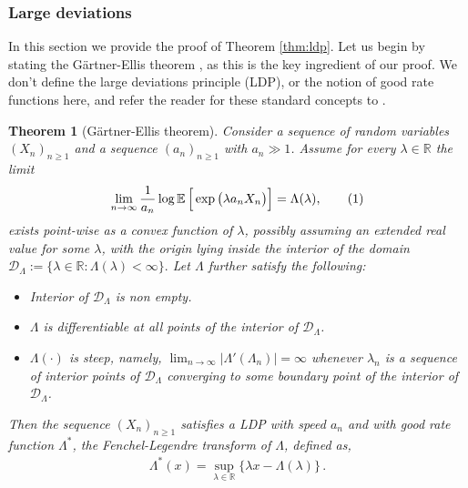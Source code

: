 \documentclass{article}
\newcommand{\E}{\mathbb{E}}								%
\newcommand{\Exp}[1]{\E\left[#1\right]}					%
\newcommand{\1}{\mathbbm{1}}								%
\newcommand\numberthis{\addtocounter{equation}{1}\tag{\theequation}}
\newtheorem{theorem}{Theorem}[section]
\theoremstyle{definition}
\numberwithin{equation}{section}
\newcommand{\cD}{\mathcal D}
\newcommand{\R}{\mathbb R}
\begin{document}
\subsubsection{Large deviations}\label{sec:ldp}

In this section we provide the proof of Theorem \ref{thm:ldp}. Let us begin by stating the Gärtner-Ellis theorem \cite[Theorem 2.3.6]{dembo2009large}, as this is the key ingredient of our proof. We don't define the large deviations principle (LDP), or the notion of good rate functions here, and refer the reader for these standard concepts to \cite[Chapter 1]{dembo2009large}.
\begin{theorem}[Gärtner-Ellis theorem]\label{thm:gartner_ellis}
    Consider a sequence of random variables $(X_n)_{n \geq 1}$ and a sequence $(a_n)_{n \geq 1}$ with $a_n \gg 1$. Assume for every $\lambda \in \R$ the limit
    \begin{align*}
    \lim_{n \to \infty}\frac{1}{a_n}\log \Exp{\Big.\exp\big(\lambda a_nX_n\big)}= \Lambda(\lambda),  \numberthis \label{eq:lim_log_mom_gen_fn}
\end{align*}
    exists point-wise as a convex function of $\lambda$, possibly assuming an extended real value for some $\lambda$, with the origin lying inside the interior of the domain $\cD_{\Lambda}:=\{\lambda \in \R:\Lambda(\lambda)<\infty\}.$ Let $\Lambda$ further satisfy the following:
    \begin{itemize}
    \item Interior of $\cD_{\Lambda}$ is non empty.
    \item $\Lambda$ is differentiable at all points of the interior of $\cD_{\Lambda}$.
    \item $\Lambda(\cdot)$ is steep, namely, $\lim_{n \to \infty} |\Lambda'(\Lambda_n)|=\infty$ whenever $\lambda_n$ is a sequence of interior points of $\cD_{\Lambda}$ converging to some boundary point of the interior of $\cD_{\Lambda}$.
\end{itemize}
Then the sequence $(X_n)_{n \geq 1}$ satisfies a LDP with speed $a_n$ and with good rate function $\Lambda^*$, the \emph{Fenchel-Legendre} transform of $\Lambda$, defined as,
\begin{align*}
    \Lambda^*(x)=\sup_{\lambda \in \R}\Big\{\lambda x -\Lambda(\lambda)\Big\}\,.
\end{align*}
\end{theorem}
\end{document}
